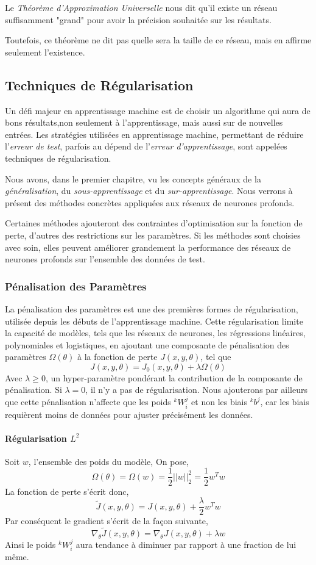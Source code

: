 \documentclass[a4paper, 11pt]{report}
\newcommand{\lexp}[1]{\phantom{}^{#1}}
\newcommand{\elem}[4]{\lexp{#2}#1^{#3}_{#4}}
\begin{document}
Le \emph{Théorème d'Approximation Universelle} nous dit qu'il existe un réseau suffisamment "grand" pour avoir la précision souhaitée sur les résultats.

Toutefois, ce théorème ne dit pas quelle sera la taille de ce réseau, mais en affirme seulement l'existence.
\subsection{Techniques de Régularisation}
Un défi majeur en apprentissage machine est de choisir un algorithme qui aura de bons résultats,non seulement à l'apprentissage, mais aussi sur de nouvelles entrées.
Les stratégies utilisées en apprentissage machine, permettant de réduire l'\emph{erreur de test}, parfois au dépend de l'\emph{erreur d'apprentissage}, sont appelées techniques de régularisation.

Nous avons, dans le premier chapitre, vu les concepts généraux de la \emph{généralisation}, du \emph{sous-apprentissage} et du \emph{sur-apprentissage}.
Nous verrons à présent des méthodes concrètes appliquées aux réseaux de neurones profonds.

Certaines méthodes ajouteront des contraintes d'optimisation sur la fonction de perte, d'autres des restrictions sur les paramètres.
Si les méthodes sont choisies avec soin, elles peuvent améliorer grandement la performance des réseaux de neurones profonds sur l'ensemble des données de test.
\subsubsection{Pénalisation des Paramètres}
La pénalisation des paramètres est une des premières formes de régularisation, utilisée depuis les débuts de l'apprentissage machine.
Cette régularisation limite la capacité de modèles, tels que les réseaux de neurones, les régressions linéaires, polynomiales et logistiques, en ajoutant une composante de pénalisation des paramètres $\Omega(\theta)$ à la fonction de perte $J(x,y,\theta)$, tel que
$$J(x,y,\theta) = J_0(x,y,\theta) + \lambda \Omega(\theta)$$
Avec $\lambda \geq 0$, un hyper-paramètre pondérant la contribution de la composante de pénalisation.
Si $\lambda = 0$, il n'y a pas de régularisation.
Nous ajouterons par ailleurs que cette pénalisation n'affecte que les poids $\elem{W}{k}{j}{i}$ et non les biais $\elem{b}{k}{j}{}$, car les biais requièrent moins de données pour ajuster précisément les données.
\paragraph{Régularisation $L^2$}
Soit $w$, l'ensemble des poids du modèle,
On pose, $$\Omega(\theta) = \Omega(w) = \frac{1}{2} ||w||_2^2 = \frac{1}{2} w^T w$$
La fonction de perte s'écrit donc,
$$\tilde{J}(x,y,\theta) = J(x,y,\theta) + \frac{\lambda}{2} w^T w$$
Par conséquent le gradient s'écrit de la façon suivante,
$$\nabla_\theta \tilde{J}(x,y,\theta) = \nabla_\theta J(x,y,\theta) + \lambda w$$
Ainsi le poids $\elem{W}{k}{j}{i}$ aura tendance à diminuer par rapport à une fraction de lui même.
\end{document}
